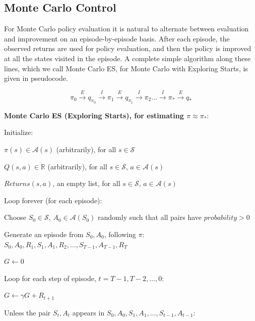 \documentclass{article}
\begin{document}
\subsection{Monte Carlo Control}

For Monte Carlo policy evaluation it is natural to alternate between evaluation and improvement on an episode-by-episode basis. 
After each episode, the observed returns are used for policy evaluation, and then the policy is improved at all the states visited in the episode. 
A complete simple algorithm along these lines, which we call Monte Carlo ES, for Monte Carlo with Exploring Starts, is given in pseudocode.

\[\pi_0 \overset{E}{\rightarrow} q_{\pi_0} \overset{I}{\rightarrow} \pi_1  \overset{E}{\rightarrow} q_{\pi_1} \overset{I}{\rightarrow} \pi_2 \dots \overset{I}{\rightarrow} \pi_*  \overset{E}{\rightarrow} q_*\]

\textbf{Monte Carlo ES (Exploring Starts), for estimating \(\pi \approx \pi_*\)}:

Initialize:

\hspace{.5cm} \(\pi(s) \in \mathcal{A}(s)\) (arbitrarily), for all \(s \in \mathcal{S}\)

\hspace{.5cm} \(Q(s, a) \in \mathbb{R}\) (arbitrarily), for all \(s \in \mathcal{S}\), \(a \in \mathcal{A}(s)\)

\hspace{.5cm} \(Returns(s, a)\), an empty list, for all \(s \in \mathcal{S}\), \(a \in \mathcal{A}(s)\)

Loop forever (for each episode):

\hspace{.5cm} Choose  \(S_0 \in \mathcal{S}\), \(A_0 \in \mathcal{A}(S_0)\) randomly such that all pairs have \(probability > 0\)

\hspace{.5cm} Generate an episode from \(S_0, A_0\), following \(\pi\): \(S_0, A_0, R_1, S_1, A_1, R_2, \dots, S_{T - 1}, A_{T - 1}, R_{T}\)

\hspace{.5cm} \(G \leftarrow 0\)

\hspace{.5cm} Loop for each step of episode, \(t = T - 1, T - 2, \dots, 0\):

\hspace{1cm} \(G \leftarrow \gamma G + R_{t + 1}\)

\hspace{1cm} Unless the pair \(S_t, A_t\) appears in \(S_0, A_0, S_1, A_1, \dots, S_{t - 1}, A_{t - 1}\):
\end{document}
